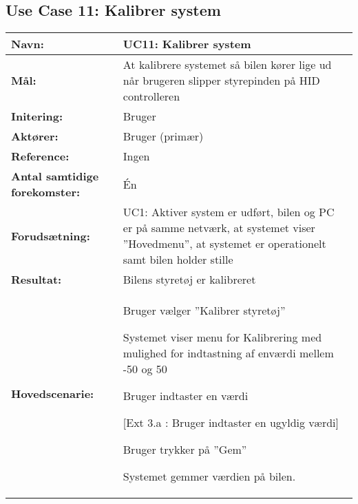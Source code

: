 \subsection{Use Case 11: Kalibrer system}
\begin{table}[h]
\begin{tabularx}{\textwidth}{| >{\raggedright\arraybackslash}p{3.3 cm} | >{\raggedright\arraybackslash}X |} \hline

\textbf{Navn:} 						& UC11: Kalibrer system\\ \hline
\textbf{Mål:}						& At kalibrere systemet så bilen kører lige ud når brugeren slipper styrepinden på HID controlleren \\ \hline
\textbf{Initering:}					& Bruger \\ \hline
\textbf{Aktører:} 					& Bruger (primær) \\ \hline
\textbf{Reference:} 			    & Ingen\\ \hline
\textbf{Antal samtidige forekomster:} & Én \\ \hline
\textbf{Forudsætning:} 				& UC1: Aktiver system er udført, bilen og PC er på samme netværk, at systemet viser ''Hovedmenu'', at systemet er operationelt samt bilen holder stille\\ \hline
\textbf{Resultat:}					& Bilens styretøj er kalibreret \\ \hline
\textbf{Hovedscenarie:}				& 

\begin{packed_enum}
\item Bruger vælger ''Kalibrer styretøj''
\item Systemet viser menu for Kalibrering med mulighed for indtastning af enværdi mellem -50 og 50 %
\item Bruger indtaster en værdi 
	\begin{packed_item}\itemsep1pt \parskip0pt \parsep0pt
	\item {[}Ext 3.a : Bruger indtaster en ugyldig værdi{]} %
	\end{packed_item}
\item Bruger trykker på ''Gem''
\item Systemet gemmer værdien på bilen.


\end{packed_enum}
\end{tabularx}
\end{table}
